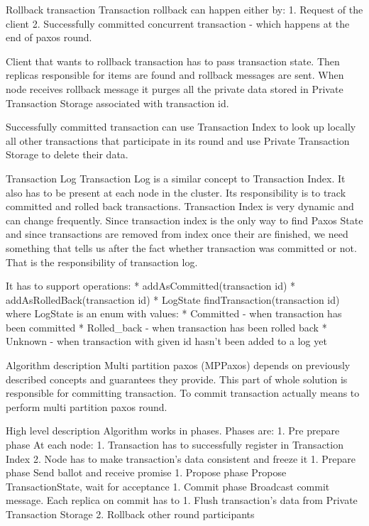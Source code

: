 Rollback transaction
Transaction rollback can happen either by:
1. Request of the client
2. Successfully committed concurrent transaction - which happens at the end of paxos round.


Client that wants to rollback transaction has to pass transaction state. Then replicas responsible for items are found and rollback messages are sent. When node receives rollback message it purges all the private data stored in Private Transaction Storage associated with transaction id.


Successfully committed transaction can use Transaction Index to look up locally all other transactions that participate in its round and use Private Transaction Storage to delete their data.


Transaction Log
Transaction Log is a similar concept to Transaction Index. It also has to be present at each node in the cluster. Its responsibility is to track committed and rolled back transactions. Transaction Index is very dynamic and can change frequently. Since transaction index is the only way to find Paxos State and since transactions are removed from index once their are finished, we need something that tells us after the fact whether transaction was committed or not. That is the responsibility of transaction log.


It has to support operations:
* addAsCommitted(transaction id)
* addAsRolledBack(transaction id)
* LogState findTransaction(transaction id) where LogState is an enum with values: 
   * Committed - when transaction has been committed
   * Rolled_back - when transaction has been rolled back
   * Unknown - when transaction with given id hasn’t been added to a log yet


        Algorithm description
Multi partition paxos (MPPaxos) depends on previously described concepts and guarantees they provide. This part of whole solution is responsible for committing transaction. To commit transaction actually means to perform multi partition paxos round. 


        High level description
Algorithm works in phases. Phases are:
1. Pre prepare phase
At each node:
   1. Transaction has to successfully register in Transaction Index
   2. Node has to make transaction’s data consistent and freeze it
1. Prepare phase
Send ballot and receive promise
1. Propose phase
Propose TransactionState, wait for acceptance
1. Commit phase
        Broadcast commit message. Each replica on commit has to
   1. Flush transaction’s data from Private Transaction Storage
   2. Rollback other round participants
        
